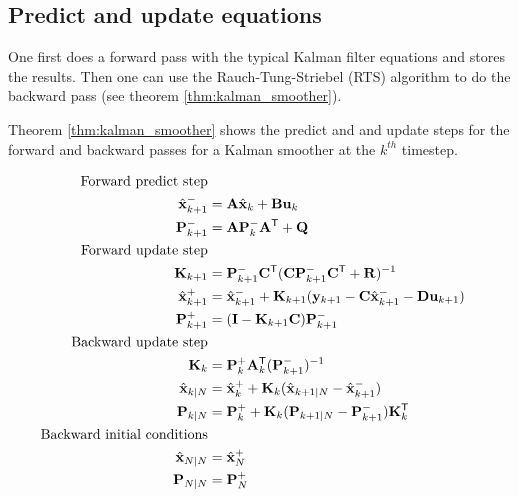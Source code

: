 \subsection{Predict and update equations}

One first does a forward pass with the typical Kalman filter equations and
stores the results. Then one can use the Rauch-Tung-Striebel (RTS) algorithm to
do the backward pass (see theorem \ref{thm:kalman_smoother}).

Theorem \ref{thm:kalman_smoother} shows the predict and and update steps for the
forward and backward passes for a Kalman smoother at the $k^{th}$ timestep.

\begin{theorem}
  \label{thm:kalman_smoother}
  \begin{align}
    \text{Forward predict step} \nonumber \\
    \hat{\mathbf{x}}_{k+1}^- &= \mathbf{A}\hat{\mathbf{x}}_k + \mathbf{B} \mathbf{u}_k \\
    \mathbf{P}_{k+1}^- &= \mathbf{A} \mathbf{P}_k^- \mathbf{A}^\mathsf{T} + \mathbf{Q} \\
    \text{Forward update step} \nonumber \\
    \mathbf{K}_{k+1} &=
      \mathbf{P}_{k+1}^- \mathbf{C}^\mathsf{T} (\mathbf{C}\mathbf{P}_{k+1}^- \mathbf{C}^\mathsf{T} +
      \mathbf{R})^{-1} \\
    \hat{\mathbf{x}}_{k+1}^+ &=
      \hat{\mathbf{x}}_{k+1}^- + \mathbf{K}_{k+1}(\mathbf{y}_{k+1} -
      \mathbf{C} \hat{\mathbf{x}}_{k+1}^- - \mathbf{D}\mathbf{u}_{k+1}) \\
    \mathbf{P}_{k+1}^+ &= (\mathbf{I} - \mathbf{K}_{k+1}\mathbf{C})\mathbf{P}_{k+1}^- \\
    \text{Backward update step} \nonumber \\
    \mathbf{K}_k &= \mathbf{P}_k^+ \mathbf{A}_k^\mathsf{T} (\mathbf{P}_{k+1}^-)^{-1} \\
    \hat{\mathbf{x}}_{k|N} &= \hat{\mathbf{x}}_k^+ +
      \mathbf{K}_k(\hat{\mathbf{x}}_{k+1|N} - \hat{\mathbf{x}}_{k+1}^-) \\
    \mathbf{P}_{k|N} &=
      \mathbf{P}_k^+ + \mathbf{K}_k(\mathbf{P}_{k+1|N} - \mathbf{P}_{k+1}^-)\mathbf{K}_k^\mathsf{T} \\
    \text{Backward initial conditions} \nonumber \\
    \hat{\mathbf{x}}_{N|N} &= \hat{\mathbf{x}}_N^+ \\
    \mathbf{P}_{N|N} &= \mathbf{P}_N^+
  \end{align}
\end{theorem}

